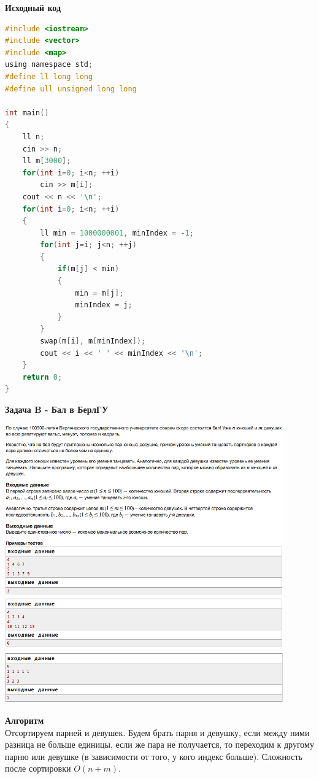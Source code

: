 \documentclass[a4paper,12pt]{article}
\begin{document}
\textbf{{\large Исходный код}}
\begin{lstlisting}[language=C]
#include <iostream>
#include <vector>
#include <map>
using namespace std;
#define ll long long
#define ull unsigned long long

int main()
{
    ll n;
    cin >> n;
    ll m[3000];
    for(int i=0; i<n; ++i)
        cin >> m[i];
    cout << n << '\n';
    for(int i=0; i<n; ++i)
    {
        ll min = 1000000001, minIndex = -1;
        for(int j=i; j<n; ++j)
        {
            if(m[j] < min)
            {
                min = m[j];
                minIndex = j;
            }
        }
        swap(m[i], m[minIndex]);
        cout << i << ' ' << minIndex << '\n';
    }
    return 0;
}
\end{lstlisting}

\newpage
\textbf{{\large Задача B - Бал в БерлГУ}} \\
\begin{center}
\includegraphics[width=0.9\textwidth]{C_277_5/C_277_5_B1.png}\\
\includegraphics[width=0.9\textwidth]{C_277_5/C_277_5_B2.png}\\ [1cm]
\end{center}
\textbf{{\large Алгоритм}} \\
Отсортируем парней и девушек. Будем брать парня и девушку, если между ними разница не больше единицы, если же пара не получается, то переходим к другому парню или девушке (в зависимости от того, у кого индекс больше). Сложность после сортировки $O(n+m)$.\\
\end{document}

